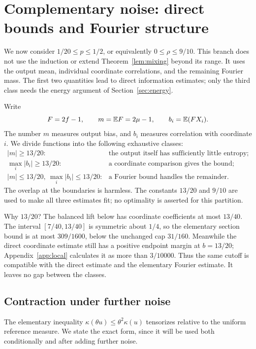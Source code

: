 \section{Complementary noise: direct bounds and Fourier structure}\label{sec:threeclasses}
We now consider $1/20\le p\le1/2$, or equivalently $0\le\rho\le9/10$. This branch does not use the induction or extend Theorem~\ref{lem:mixing} beyond its range. It uses the output mean, individual coordinate correlations, and the remaining Fourier mass. The first two quantities lead to direct information estimates; only the third class needs the energy argument of Section~\ref{sec:energy}.

Write
\begin{equation}\label{eq:signnotation}
F=2f-1,\qquad m=\mathbb E F=2\mu-1,\qquad b_i=\mathbb E(FX_i).
\end{equation}
The number $m$ measures output bias, and $b_i$ measures correlation with coordinate $i$. We divide functions into the following exhaustive classes:
\[
\begin{array}{ll}
|m|\ge13/20: & \text{the output itself has sufficiently little entropy};\\[2pt]
\max_i|b_i|\ge13/20: & \text{a coordinate comparison gives the bound};\\[2pt]
|m|\le13/20,\ \max_i|b_i|\le13/20: & \text{a Fourier bound handles the remainder}.
\end{array}
\]
The overlap at the boundaries is harmless. The constants $13/20$ and $9/10$ are used to make all three estimates fit; no optimality is asserted for this partition.

Why $13/20$? The balanced lift below has coordinate coefficients at most $13/40$. The interval $[7/40,13/40]$ is symmetric about $1/4$, so the elementary section bound is at most $309/1600$, below the unchanged cap $31/160$. Meanwhile the direct coordinate estimate still has a positive endpoint margin at $b=13/20$; Appendix~\ref{app:local} calculates it as more than $3/10000$. Thus the same cutoff is compatible with the direct estimate and the elementary Fourier estimate. It leaves no gap between the classes.

\subsection{Contraction under further noise}
The elementary inequality $\kappa(\theta u)\le\theta^2\kappa(u)$ tensorizes relative to the uniform reference measure. We state the exact form, since it will be used both conditionally and after adding further noise.

